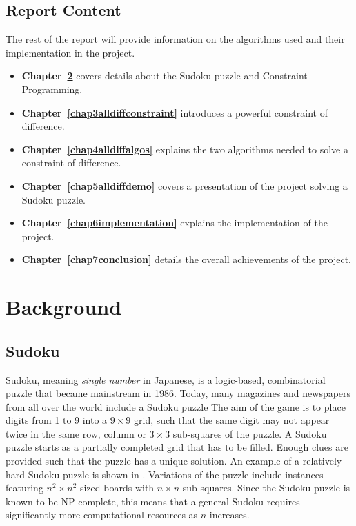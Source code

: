 \documentclass{l4proj}
\begin{document}
\section{Report Content}
The rest of the report will provide information on the algorithms used and their implementation in the project.
\begin{itemize}
\item \textbf{Chapter~\ref{chap2background}} covers details about the Sudoku puzzle and Constraint Programming.
\item \textbf{Chapter~\ref{chap3alldiffconstraint}} introduces a powerful constraint of difference.
\item \textbf{Chapter~\ref{chap4alldiffalgos}} explains the two algorithms needed to solve a constraint of difference.
\item \textbf{Chapter~\ref{chap5alldiffdemo}} covers a presentation of the project solving a Sudoku puzzle.
\item \textbf{Chapter~\ref{chap6implementation}} explains the implementation of the project.
\item \textbf{Chapter~\ref{chap7conclusion}} details the overall achievements of the project.
\end{itemize}

\chapter{Background}
\label{chap2background}
\section{Sudoku}
\noindent Sudoku, meaning \textit{single number} in Japanese, is a logic-based, combinatorial puzzle that became mainstream in 1986. Today, many magazines and newspapers from all over the world include a Sudoku puzzle The aim of the game is to place digits from 1 to 9 into a $9 \times 9$ grid, such that the same digit may not appear twice in the same row, column or $3\times 3$ sub-squares of the puzzle. A Sudoku puzzle starts as a partially completed grid that has to be filled. Enough clues are provided such that the puzzle has a unique solution. An example of a relatively hard Sudoku puzzle is shown in . Variations of the puzzle include instances featuring $n^2\times n^2$ sized boards with $n\times n$ sub-squares. Since the Sudoku puzzle is known to be NP-complete, this means that a general Sudoku requires significantly more computational resources as $n$ increases.
\end{document}
